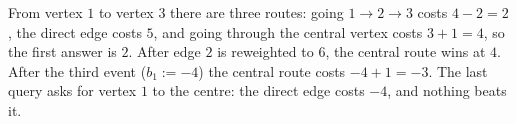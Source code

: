 From vertex $1$ to vertex $3$ there are three routes: going $1 \to 2 \to 3$ costs $4 - 2 = 2$, the direct edge costs $5$, and going through the central vertex costs $3 + 1 = 4$, so the first answer is $2$. After edge $2$ is reweighted to $6$, the central route wins at $4$. After the third event ($b_1 := -4$) the central route costs $-4 + 1 = -3$. The last query asks for vertex $1$ to the centre: the direct edge costs $-4$, and nothing beats it.
